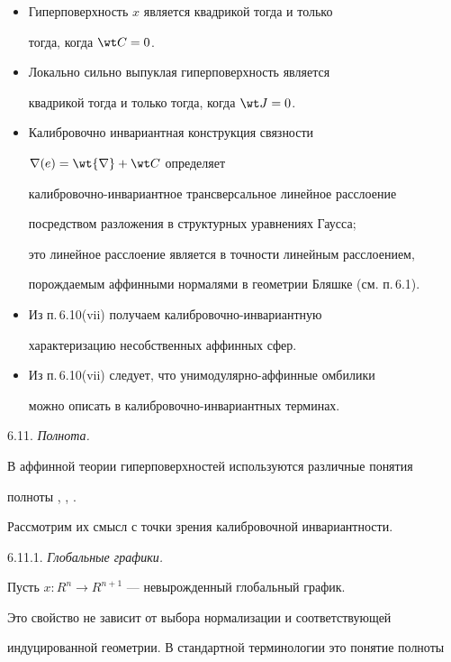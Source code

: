 \begin{itemize}

\item[(i)] Гиперповерхность $x$ является квадрикой тогда и только

тогда, когда $\wt C = 0$.

\item[(ii)] Локально сильно выпуклая гиперповерхность является

квадрикой тогда и только тогда, когда $\wt J = 0$.

\item[(iii)] Калибровочно инвариантная конструкция связности

$\nabla (e) = \wt {\nabla} + \wt C $ определяет

ка\-либ\-ро\-воч\-но-инвариантное трансверсальное линейное расслоение

посредством разложения в структурных уравнениях Гаусса;

это линейное расслоение является в точности линейным расслоением,

порождаемым аффинными нормалями в геометрии Бляшке (см. п.\,6.1).

\item[(iv)] Из п.\,6.10(vii) получаем калибровочно-инвариантную

характеризацию несобственных аффинных сфер.

\item[(iv)] Из п.\,6.10(vii) следует, что унимодулярно-аффинные омбилики

можно описать в ка\-либ\-ро\-воч\-но-инвариантных терминах.

\end{itemize}



6.11. {\it Полнота.}

В аффинной теории гиперповерхностей используются различные понятия

полноты \cite{LI-S-Z-1}, \cite{LI-S-Z-2}, \cite{LI-LI-S}.

Рассмотрим их смысл с точки зрения калибровочной инвариантности.

\smallskip



6.11.1. {\it Глобальные графики.}

Пусть $x: R^n \to R^{n+1}$ --- невырожденный глобальный график.

Это свойство не зависит от выбора нормализации и соответствующей

индуцированной геометрии. В стандартной терминологии это понятие полноты 

